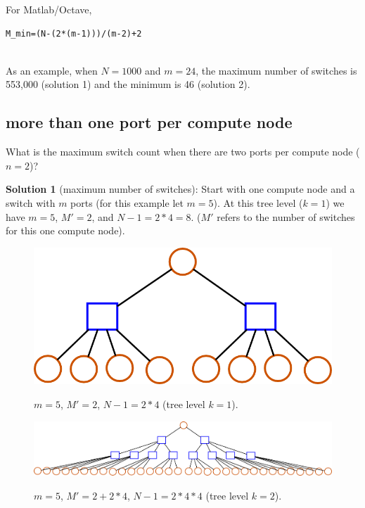 \documentclass[pdftex]{article}
\begin{document}
For Matlab/Octave,
\begin{verbatim}
M_min=(N-(2*(m-1)))/(m-2)+2 
\end{verbatim}


\ \\
As an example, when $N=1000$ and $m=24$, the maximum number of switches is 553,000 (solution 1) and the minimum is 46 (solution 2).

\subsection{more than one port per compute node}
What is the maximum switch count when there are two ports per compute node ($n=2$)? 

\textbf{Solution 1} (maximum number of switches): Start with one compute node and a switch with $m$ ports (for this example let $m=5$). At this tree level ($k=1$) we have $m=5$, $M'=2$, and $N-1=2*4=8$. ($M'$ refers to the number of switches for this one compute node).


\begin{figure}[h!]
\begin{center}
\includegraphics[scale=0.3]{pictures/N9_n2_M2_m5_tree}
\label{fig:ngt1k1}
 \caption{$m=5$, $M'=2$, $N-1=2*4$ (tree level $k=1$). }
\end{center}
\end{figure}

\begin{figure}[h!]
\begin{center}
\includegraphics[scale=0.3]{pictures/N33_n2_M10_m5_tree}
\label{fig:ngt1k2}
 \caption{$m=5$, $M'=2+2*4$, $N-1=2*4*4$ (tree level $k=2$). }
\end{center}
\end{figure}
\end{document}

